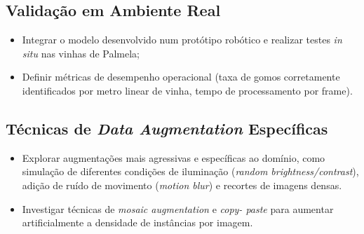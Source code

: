 \subsection{Validação em Ambiente Real}

\begin{itemize}
  \item Integrar o modelo desenvolvido num protótipo robótico e realizar
    testes \textit{in situ} nas vinhas de Palmela;

  \item Definir métricas de desempenho operacional (taxa de gomos
    corretamente identificados por metro linear de vinha, tempo de
    processamento por frame).
\end{itemize}

\subsection{Técnicas de \textit{Data Augmentation} Específicas}

\begin{itemize}
  \item Explorar augmentações mais agressivas e específicas ao domínio,
    como simulação de diferentes condições de iluminação (\textit{random
    brightness/contrast}), adição de ruído de movimento (\textit{motion
    blur}) e recortes de imagens densas.

  \item Investigar técnicas de \textit{mosaic augmentation} e \textit{copy-
    paste} para aumentar artificialmente a densidade de instâncias por
    imagem.
\end{itemize}
